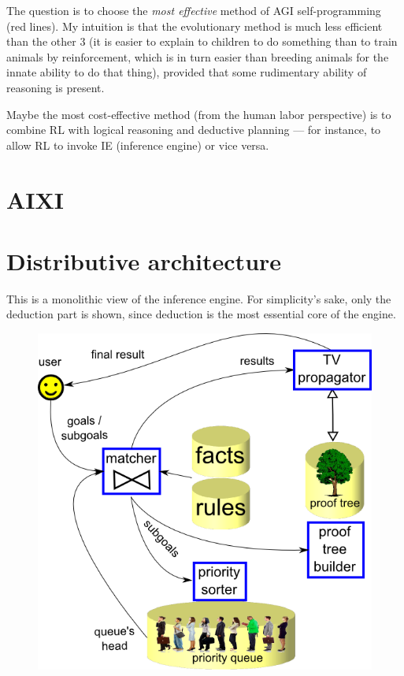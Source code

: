 The question is to choose the \textit{most effective} method of AGI self-programming (red lines).  My intuition is that the evolutionary method is much less efficient than the other 3 (it is easier to explain to children to do something than to train animals by reinforcement, which is in turn easier than breeding animals for the innate ability to do that thing), provided that some rudimentary ability of reasoning is present.

Maybe the most cost-effective method (from the human labor perspective) is to combine RL with logical reasoning and deductive planning --- for instance, to allow RL to invoke IE (inference engine) or vice versa.

\section{AIXI}

\underconst

\section{Distributive architecture}

This is a monolithic view of the inference engine.  For simplicity's sake, only the deduction part is shown, since deduction is the most essential core of the engine.

\begin{figure}[H]
\centering
\includegraphics[scale=0.5]{breakdown-IE-1.png}
\end{figure}

